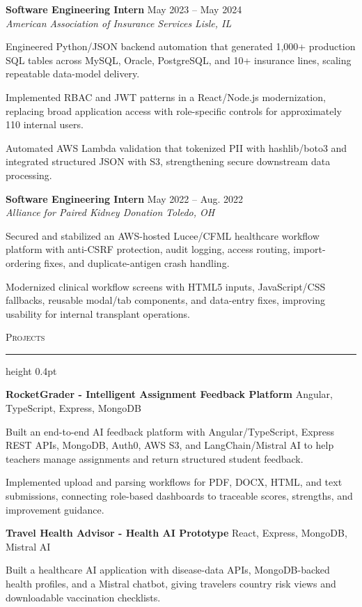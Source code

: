 \documentclass[letterpaper,11pt]{article}
\newcommand{\resumesection}[1]{%
  \par\vspace{2pt}%
  {\large\scshape #1}\par\vspace{2pt}%
  \hrule height 0.4pt\vspace{2pt}%
}
\newcommand{\resumeSubheading}[4]{
  \textbf{#1} \hfill #2\\
  \textit{#3} \hfill \textit{#4}
}
\newcommand{\projectHeading}[2]{
  \textbf{#1} \hfill #2
}
\begin{document}
\resumeSubheading
{Software Engineering Intern}{May 2023 -- May 2024}
{American Association of Insurance Services}{Lisle, IL}
\begin{tightitemize}
  \item Engineered Python/JSON backend automation that generated 1,000+ production SQL tables across MySQL, Oracle, PostgreSQL, and 10+ insurance lines, scaling repeatable data-model delivery.
  \item Implemented RBAC and JWT patterns in a React/Node.js modernization, replacing broad application access with role-specific controls for approximately 110 internal users.
  \item Automated AWS Lambda validation that tokenized PII with hashlib/boto3 and integrated structured JSON with S3, strengthening secure downstream data processing.
\end{tightitemize}

\resumeSubheading
{Software Engineering Intern}{May 2022 -- Aug. 2022}
{Alliance for Paired Kidney Donation}{Toledo, OH}
\begin{tightitemize}
  \item Secured and stabilized an AWS-hosted Lucee/CFML healthcare workflow platform with anti-CSRF protection, audit logging, access routing, import-ordering fixes, and duplicate-antigen crash handling.
  \item Modernized clinical workflow screens with HTML5 inputs, JavaScript/CSS fallbacks, reusable modal/tab components, and data-entry fixes, improving usability for internal transplant operations.
\end{tightitemize}

\resumesection{Projects}
\projectHeading{RocketGrader - Intelligent Assignment Feedback Platform}{Angular, TypeScript, Express, MongoDB}
\begin{tightitemize}
  \item Built an end-to-end AI feedback platform with Angular/TypeScript, Express REST APIs, MongoDB, Auth0, AWS S3, and LangChain/Mistral AI to help teachers manage assignments and return structured student feedback.
  \item Implemented upload and parsing workflows for PDF, DOCX, HTML, and text submissions, connecting role-based dashboards to traceable scores, strengths, and improvement guidance.
\end{tightitemize}

\projectHeading{Travel Health Advisor - Health AI Prototype}{React, Express, MongoDB, Mistral AI}
\begin{tightitemize}
  \item Built a healthcare AI application with disease-data APIs, MongoDB-backed health profiles, and a Mistral chatbot, giving travelers country risk views and downloadable vaccination checklists.
\end{tightitemize}
\end{document}
